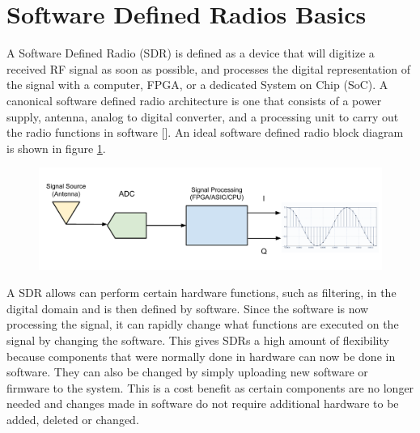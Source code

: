 

 
\section{Software Defined Radios Basics} 
A Software Defined Radio (SDR) is defined as a device that will digitize a received RF signal as soon as possible, and processes the digital representation of the signal with a computer, FPGA, or a dedicated System on Chip (SoC).  A canonical software defined radio architecture is one that consists of a power supply, antenna, analog to digital converter, and a processing unit to carry out the radio functions in software [\cite{Mitola1995}]. An ideal software defined radio block diagram is shown in figure \ref{ideal_sdr}.

{\begin{figure}[h!tb] 
\centering
\includegraphics[width=\textwidth]{Images/SDR_Ideal_block.pdf}
\label{ideal_sdr}
\end{figure}
}

A SDR allows can perform certain hardware functions, such as filtering, in the digital domain and is then defined by software.  Since the software is now processing the signal, it can rapidly change what functions are executed on the signal by changing the software.  This gives SDRs a high amount of flexibility because components that were normally done in hardware can now be done in software.  They can also be changed by simply uploading new software or firmware to the system.  This is a cost benefit as certain components are no longer needed and changes made in software do not require additional hardware to be added, deleted or changed.


